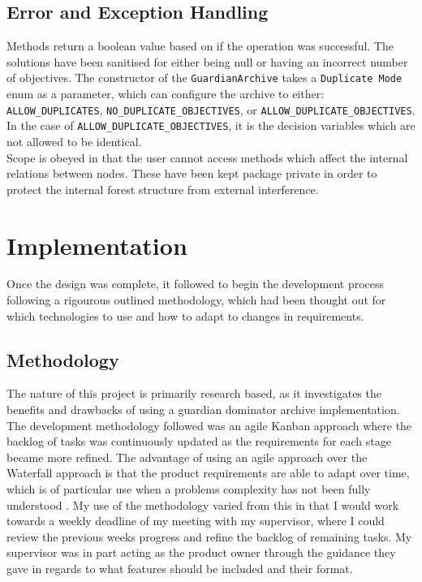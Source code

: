 \documentclass{ecmm427_assignment}
\begin{document}
\subsection{Error and Exception Handling}
Methods return a boolean value based on if the operation was successful. The solutions have been sanitised for either being null or having an incorrect number of objectives.
The constructor of the \texttt{GuardianArchive} takes a \texttt{Duplicate Mode} enum as a parameter, which can configure the archive to either: \texttt{ALLOW\_DUPLICATES}, \texttt{NO\_DUPLICATE\_OBJECTIVES}, or \texttt{ALLOW\_DUPLICATE\_OBJECTIVES}. In the case of \texttt{ALLOW\_DUPLICATE\_OBJECTIVES}, it is the decision variables which are not allowed to be identical.
\\Scope is obeyed in that the user cannot access methods which affect the internal relations between nodes. These have been kept package private in order to protect the internal forest structure from external interference.

\section{Implementation}
Once the design was complete, it followed to begin the development process following a rigourous outlined methodology, which had been thought out for which technologies to use and how to adapt to changes in requirements.

\subsection{Methodology}
The nature of this project is primarily research based, as it investigates the benefits and drawbacks of using a guardian dominator archive implementation. The development methodology followed was an agile Kanban approach where the backlog of tasks was continuously updated as the requirements for each stage became more refined. The advantage of using an agile approach over the Waterfall approach is that the product requirements are able to adapt over time, which is of particular use when a problems complexity has not been fully understood \cite{Balaji2012}. My use of the methodology varied from this in that I would work towards a weekly deadline of my meeting with my supervisor, where I could review the previous weeks progress and refine the backlog of remaining tasks. My supervisor was in part acting as the product owner through the guidance they gave in regards to what features should be included and their format.
\end{document}
